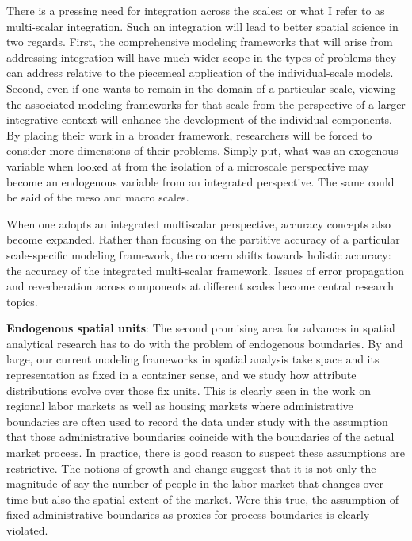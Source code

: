 \documentclass[11pt]{article}
\begin{document}
There is a pressing need for integration across the scales: or what I refer to
as multi-scalar integration. Such an integration will lead to better spatial
science in two regards. First, the comprehensive modeling frameworks that will
arise from addressing integration will have much wider scope in the types of
problems they can address relative to the piecemeal application of the
individual-scale models. Second, even if one wants to remain in the domain of a
particular scale, viewing the associated modeling frameworks for that scale
from the perspective of a larger integrative context will enhance the development
of the individual components. By placing their work in a broader framework,
researchers will be forced to consider more dimensions of their problems.
Simply put, what was an exogenous variable when looked at from the isolation of
a microscale perspective may become an endogenous variable from an integrated
perspective. The same could be said of the meso and macro scales.

When one adopts an integrated multiscalar perspective, accuracy concepts also
become expanded. Rather than focusing on the partitive accuracy of a particular
scale-specific modeling framework, the concern shifts towards holistic accuracy:
the accuracy of the integrated multi-scalar framework. Issues of error
propagation and reverberation across components at different scales become
central research topics.


\textbf{Endogenous spatial units}: The second promising area for advances in spatial
analytical research has to do with the problem of endogenous boundaries. By and
large, our current modeling frameworks in spatial analysis take space and its
representation as fixed in a container sense, and we study how attribute
distributions evolve over those fix units. This is clearly seen in the work on
regional labor markets as well as housing markets where administrative
boundaries are often used to record the data under study with the assumption
that those administrative boundaries coincide with the boundaries of the actual
market process. In practice, there is good reason to suspect these assumptions
are restrictive. The  notions of growth and change suggest that it is not
only the magnitude of say the number of people in the labor market that changes
over time but also the spatial extent of the market. Were this true, the
assumption of fixed administrative boundaries as proxies for process boundaries
is clearly violated.
\end{document}
